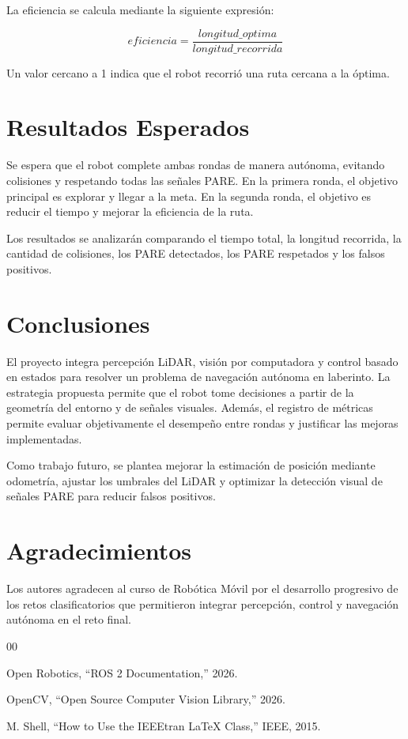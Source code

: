 \documentclass[conference]{IEEEtran}
\begin{document}
La eficiencia se calcula mediante la siguiente expresión:

\begin{equation}
eficiencia = \frac{longitud\_optima}{longitud\_recorrida}
\end{equation}

Un valor cercano a 1 indica que el robot recorrió una ruta cercana a la óptima.

\section{Resultados Esperados}

Se espera que el robot complete ambas rondas de manera autónoma, evitando colisiones y respetando todas las señales PARE. En la primera ronda, el objetivo principal es explorar y llegar a la meta. En la segunda ronda, el objetivo es reducir el tiempo y mejorar la eficiencia de la ruta.

Los resultados se analizarán comparando el tiempo total, la longitud recorrida, la cantidad de colisiones, los PARE detectados, los PARE respetados y los falsos positivos.

\section{Conclusiones}

El proyecto integra percepción LiDAR, visión por computadora y control basado en estados para resolver un problema de navegación autónoma en laberinto. La estrategia propuesta permite que el robot tome decisiones a partir de la geometría del entorno y de señales visuales. Además, el registro de métricas permite evaluar objetivamente el desempeño entre rondas y justificar las mejoras implementadas.

Como trabajo futuro, se plantea mejorar la estimación de posición mediante odometría, ajustar los umbrales del LiDAR y optimizar la detección visual de señales PARE para reducir falsos positivos.

\section*{Agradecimientos}

Los autores agradecen al curso de Robótica Móvil por el desarrollo progresivo de los retos clasificatorios que permitieron integrar percepción, control y navegación autónoma en el reto final.

\begin{thebibliography}{00}

Open Robotics, ``ROS 2 Documentation,'' 2026.

OpenCV, ``Open Source Computer Vision Library,'' 2026.

M. Shell, ``How to Use the IEEEtran LaTeX Class,'' IEEE, 2015.

\end{thebibliography}
\end{document}
